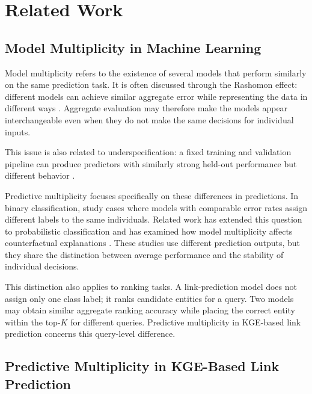 \section{Related Work}
\label{chap:predictive_multiplicity}

\subsection{Model Multiplicity in Machine Learning}

Model multiplicity refers to the existence of several models that perform
similarly on the same prediction task. It is often discussed through the
Rashomon effect: different models can achieve similar aggregate error while
representing the data in different ways
\citep{breiman2001statistical,fisher2019all}.
Aggregate evaluation may therefore make the models appear interchangeable even
when they do not make the same decisions for individual inputs.

This issue is also related to underspecification: a fixed training and
validation pipeline can produce predictors with similarly strong held-out
performance but different behavior \citep{damour2022underspecification}.

Predictive multiplicity focuses specifically on these differences in
predictions. In binary classification, \citet{marx2020predictive} study cases
where models with comparable error rates assign different labels to the same
individuals. Related work has extended this question to probabilistic
classification \citep{watsondaniels2023predictive} and has examined how model
multiplicity affects counterfactual explanations
\citep{pawelczyk2020counterfactual}. These studies use different prediction
outputs, but they share the distinction between average performance and the
stability of individual decisions.

This distinction also applies to ranking tasks. A link-prediction model does
not assign only one class label; it ranks candidate entities for a query. Two
models may obtain similar aggregate ranking accuracy while placing the correct
entity within the top-$K$ for different queries. Predictive multiplicity in
KGE-based link prediction concerns this query-level difference.

\subsection{Predictive Multiplicity in KGE-Based Link Prediction}


